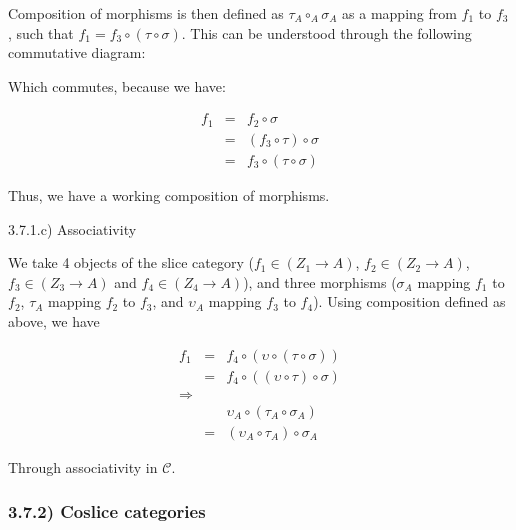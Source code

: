 Composition of morphisms is then defined as $\tau_A \circ_A \sigma_A$ as a mapping from $f_1$ to $f_3$, such that $f_1 = f_3 \circ (\tau \circ \sigma)$. This can be understood through the following commutative diagram:


Which commutes, because we have:

$$
\begin{aligned}
	f_1 &=&  f_2              \circ \sigma  \\
		&=& (f_3 \circ  \tau) \circ \sigma  \\
		&=&  f_3 \circ (\tau  \circ \sigma)
\end{aligned}
$$

Thus, we have a working composition of morphisms.

3.7.1.c) Associativity

We take 4 objects of the slice category ($f_1 \in (Z_1 \to A)$, $f_2 \in (Z_2 \to A)$, $f_3 \in (Z_3 \to A)$ and  $f_4 \in (Z_4 \to A)$), and three morphisms ($\sigma_A$ mapping $f_1$ to $f_2$, $\tau_A$ mapping $f_2$ to $f_3$, and $\upsilon_A$ mapping $f_3$ to $f_4$). Using composition defined as above, we have

$$
\begin{aligned}
f_1 &=& f_4 \circ ( \upsilon \circ (\tau  \circ \sigma)) \\
    &=& f_4 \circ ((\upsilon \circ  \tau) \circ \sigma ) \\
\Rightarrow && \\
& &  \upsilon_A \circ (\tau_A  \circ \sigma_A) \\
&=& (\upsilon_A \circ  \tau_A) \circ \sigma_A
\end{aligned}
$$

Through associativity in $\mathcal{C}$.


\subsubsection*{3.7.2) Coslice categories}

